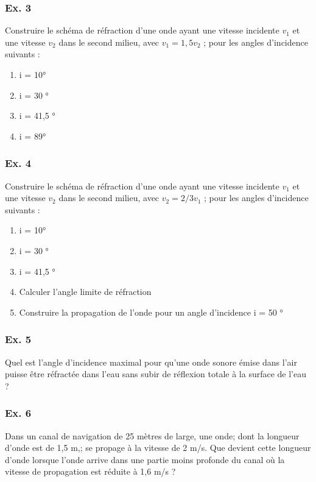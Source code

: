 \subsubsection{Ex. 3}

Construire le schéma de réfraction d'une onde ayant une vitesse
incidente $v_1$ et une vitesse $v_2$ dans le second milieu, avec $v_1 =
1,5 v_2$ ; pour les angles d'incidence suivants :
\begin{enumerate}
	\item i = 10°
	\item i = 30 °
	\item i = 41,5 °
	\item i = 89°
\end{enumerate}

\subsubsection{Ex. 4}

Construire le schéma de réfraction d'une onde ayant une vitesse
incidente $v_1$ et une vitesse $v_2$ dans le second milieu, avec $v_2 =
2/3 v_1$ ; pour les angles d'incidence suivants :
\begin{enumerate}
	\item  i = 10°
	\item  i = 30 °
	\item  i = 41,5 °
	\item  Calculer l'angle limite de réfraction
	\item  Construire la propagation de l'onde pour un angle d'incidence i = 50
	°
\end{enumerate}

\subsubsection{Ex. 5} %

Quel est l'angle d'incidence maximal pour qu'une onde sonore émise dans
l'air puisse être réfractée dans l'eau sans subir de réflexion totale à
la surface de l'eau ?

\subsubsection{Ex. 6} %

Dans un canal de navigation de 25 mètres de large, une onde; dont la
longueur d'onde est de 1,5 m,; se propage à la vitesse de 2 m/s. Que
devient cette longueur d'onde lorsque l'onde arrive dans une partie
moins profonde du canal où la vitesse de propagation est réduite à 1,6
m/s ?

